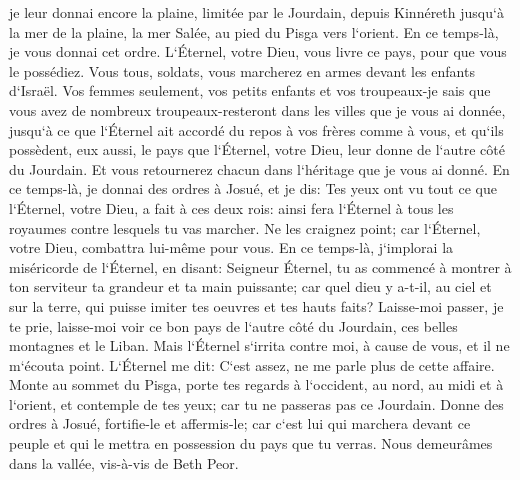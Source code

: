 \verse je leur donnai encore la plaine, limitée par le Jourdain, depuis Kinnéreth jusqu`à la mer de la plaine, la mer Salée, au pied du Pisga vers l`orient. 
\verse En ce temps-là, je vous donnai cet ordre. L`Éternel, votre Dieu, vous livre ce pays, pour que vous le possédiez. Vous tous, soldats, vous marcherez en armes devant les enfants d`Israël. 
\verse Vos femmes seulement, vos petits enfants et vos troupeaux-je sais que vous avez de nombreux troupeaux-resteront dans les villes que je vous ai donnée, 
\verse jusqu`à ce que l`Éternel ait accordé du repos à vos frères comme à vous, et qu`ils possèdent, eux aussi, le pays que l`Éternel, votre Dieu, leur donne de l`autre côté du Jourdain. Et vous retournerez chacun dans l`héritage que je vous ai donné. 
\verse En ce temps-là, je donnai des ordres à Josué, et je dis: Tes yeux ont vu tout ce que l`Éternel, votre Dieu, a fait à ces deux rois: ainsi fera l`Éternel à tous les royaumes contre lesquels tu vas marcher. 
\verse Ne les craignez point; car l`Éternel, votre Dieu, combattra lui-même pour vous. 
\verse En ce temps-là, j`implorai la miséricorde de l`Éternel, en disant: 
\verse Seigneur Éternel, tu as commencé à montrer à ton serviteur ta grandeur et ta main puissante; car quel dieu y a-t-il, au ciel et sur la terre, qui puisse imiter tes oeuvres et tes hauts faits? 
\verse Laisse-moi passer, je te prie, laisse-moi voir ce bon pays de l`autre côté du Jourdain, ces belles montagnes et le Liban. 
\verse Mais l`Éternel s`irrita contre moi, à cause de vous, et il ne m`écouta point. L`Éternel me dit: C`est assez, ne me parle plus de cette affaire. 
\verse Monte au sommet du Pisga, porte tes regards à l`occident, au nord, au midi et à l`orient, et contemple de tes yeux; car tu ne passeras pas ce Jourdain. 
\verse Donne des ordres à Josué, fortifie-le et affermis-le; car c`est lui qui marchera devant ce peuple et qui le mettra en possession du pays que tu verras. 
\verse Nous demeurâmes dans la vallée, vis-à-vis de Beth Peor. 

